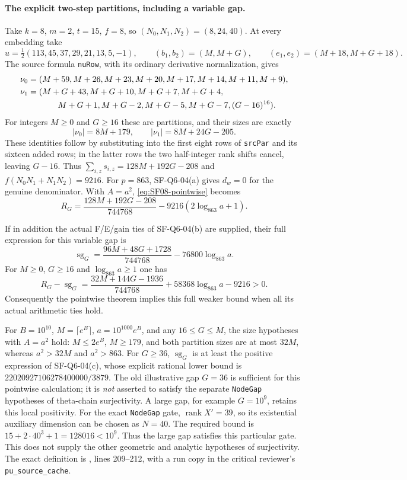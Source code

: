 \documentclass[11pt,a4paper]{article}
\theoremstyle{definition}
\theoremstyle{remark}
\begin{document}
\paragraph{The explicit two-step partitions, including a variable gap.}
Take $k=8$, $m=2$, $t=15$, $f=8$, so
$(N_0,N_1,N_2)=(8,24,40)$.  At every embedding take
\[
 u=\tfrac12(113,45,37,29,21,13,5,-1),\qquad
 (b_1,b_2)=(M,M+G),\qquad
 (e_1,e_2)=(M+18,M+G+18).
\]
The source formula \texttt{nuRow}, with its ordinary derivative
normalization, gives
\begin{align*}
 \nu_0={}&(M+59,M+26,M+23,M+20,M+17,M+14,M+11,M+9),\\
 \nu_1={}&(M+G+43,M+G+10,M+G+7,M+G+4,\\
          &\hspace{8mm}M+G+1,M+G-2,M+G-5,M+G-7,(G-16)^{16}).
\end{align*}
For integers $M\ge0$ and $G\ge16$ these are partitions, and their sizes are exactly
\[
 |\nu_0|=8M+179,\qquad |\nu_1|=8M+24G-205.
\]
These identities follow by substituting into the first eight rows
of \texttt{srcPar} and its sixteen added rows; in the latter rows
the two half-integer rank shifts cancel, leaving $G-16$.
Thus $\sum_{i,z}s_{i,z}=128M+192G-208$ and
$f(N_0N_1+N_1N_2)=9216$.
For $p=863$, SF-Q6-04(a) gives $d_w=0$ for the genuine denominator.
With $A=a^2$, \eqref{eq:SF08-pointwise} becomes
\begin{equation}\label{eq:SF08-explicit}
 R_G=\frac{128M+192G-208}{744768}
                      -9216(2\log_{863}a+1).
\end{equation}

If in addition the actual F/E/gain ties of SF-Q6-04(b) are supplied,
their full expression for this variable gap is
\[
 \operatorname{sg}_G
     =\frac{96M+48G+1728}{744768}-76800\log_{863}a.
\]
For $M\ge0$, $G\ge16$ and $\log_{863}a\ge1$ one has
\[
 R_G-\operatorname{sg}_G
 =\frac{32M+144G-1936}{744768}
                   +58368\log_{863}a-9216>0.
\]
Consequently the pointwise theorem implies this full weaker bound
when all its actual arithmetic ties hold.

For $B=10^{10}$, $M=\lceil e^B\rceil$,
$a=10^{1000}e^B$, and any $16\le G\le M$, the size hypotheses with
$A=a^2$ hold: $M\le2e^B$, $M\ge179$, and both partition sizes
are at most $32M$, whereas $a^2>32M$ and $a^2>863$.
For $G\ge36$, $\operatorname{sg}_G$ is at least the positive
expression of SF-Q6-04(c), whose explicit rational lower bound is
$22020927106278400000/3879$.
The old illustrative gap $G=36$ is sufficient for this pointwise
calculation; it is \emph{not} asserted to satisfy the separate
\texttt{NodeGap} hypotheses of theta-chain surjectivity.
A large gap, for example $G=10^9$, retains this local positivity.
For the exact \texttt{NodeGap} gate, $\operatorname{rank}X'=39$,
so its existential auxiliary dimension can be chosen as $N=40$.
The required bound is $15+2\cdot40^3+1=128016<10^9$.
Thus the large gap satisfies this particular gate.  This does not
supply the other geometric and analytic hypotheses of surjectivity.
The exact definition is
, lines 209--212,
with a run copy in the critical reviewer's \texttt{pu\_source\_cache}.
\end{document}

